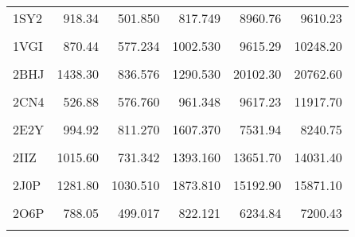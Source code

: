\begin{table}
{\begin{tabular}{lrrrrr}
				1SY2 & 918.34 & 501.850 & 817.749 & 8960.76 & 9610.23\\
				\cellcolor{gray!6}{1U9U} & \cellcolor{gray!6}{738.55} & \cellcolor{gray!6}{496.132} & \cellcolor{gray!6}{813.773} & \cellcolor{gray!6}{4675.76} & \cellcolor{gray!6}{5632.32}\\
				1VGI & 870.44 & 577.234 & 1002.530 & 9615.29 & 10248.20\\
				\cellcolor{gray!6}{1ZVI} & \cellcolor{gray!6}{1435.90} & \cellcolor{gray!6}{701.091} & \cellcolor{gray!6}{1129.540} & \cellcolor{gray!6}{19918.60} & \cellcolor{gray!6}{20968.20}\\
				\addlinespace
				2BHJ & 1438.30 & 836.576 & 1290.530 & 20102.30 & 20762.60\\
				\cellcolor{gray!6}{2CJ0} & \cellcolor{gray!6}{809.62} & \cellcolor{gray!6}{2653.180} & \cellcolor{gray!6}{4835.280} & \cellcolor{gray!6}{12749.60} & \cellcolor{gray!6}{12892.20}\\
				2CN4 & 526.88 & 576.760 & 961.348 & 9617.23 & 11917.70\\
				\cellcolor{gray!6}{2CPO} & \cellcolor{gray!6}{886.17} & \cellcolor{gray!6}{1846.490} & \cellcolor{gray!6}{3329.540} & \cellcolor{gray!6}{13081.60} & \cellcolor{gray!6}{12995.60}\\
				2E2Y & 994.92 & 811.270 & 1607.370 & 7531.94 & 8240.75\\
				\addlinespace
				\cellcolor{gray!6}{2FC2} & \cellcolor{gray!6}{1091.40} & \cellcolor{gray!6}{1011.190} & \cellcolor{gray!6}{1669.900} & \cellcolor{gray!6}{18383.50} & \cellcolor{gray!6}{18552.10}\\
				2IIZ & 1015.60 & 731.342 & 1393.160 & 13651.70 & 14031.40\\
				\cellcolor{gray!6}{2IPS} & \cellcolor{gray!6}{1242.40} & \cellcolor{gray!6}{618.252} & \cellcolor{gray!6}{1075.560} & \cellcolor{gray!6}{27760.50} & \cellcolor{gray!6}{25814.10}\\
				2J0P & 1281.80 & 1030.510 & 1873.810 & 15192.90 & 15871.10\\
				\cellcolor{gray!6}{2J18} & \cellcolor{gray!6}{841.67} & \cellcolor{gray!6}{1962.990} & \cellcolor{gray!6}{3556.340} & \cellcolor{gray!6}{12675.10} & \cellcolor{gray!6}{12779.00}\\
				\addlinespace
				2O6P & 788.05 & 499.017 & 822.121 & 6234.84 & 7200.43\\
				\cellcolor{gray!6}{2Q6N} & \cellcolor{gray!6}{1030.10} & \cellcolor{gray!6}{644.365} & \cellcolor{gray!6}{1040.080} & \cellcolor{gray!6}{20051.10} & \cellcolor{gray!6}{19747.50}\\

\end{tabular}}
\end{table}
